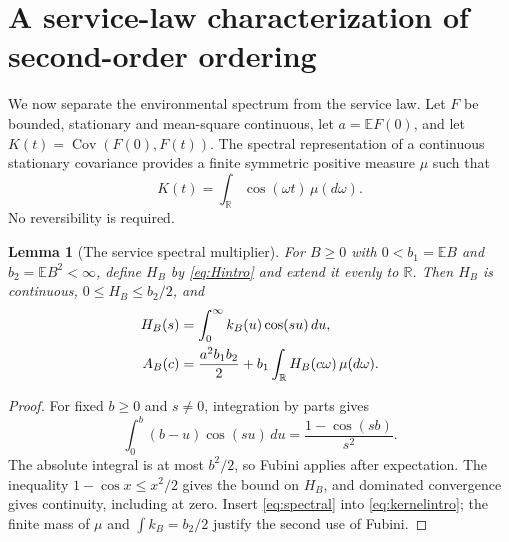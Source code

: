 \documentclass[10pt,a4paper]{amsart}
\numberwithin{equation}{section}
\newtheorem{lemma}[theorem]{Lemma}
\newcommand{\E}{\mathbb E}
\newcommand{\R}{\mathbb R}
\newcommand{\1}{\mathbf 1}
\DeclareMathOperator{\Cov}{Cov}
\begin{document}
\section{A service-law characterization of second-order ordering}\label{sec:service}
We now separate the environmental spectrum from the service law. Let $F$ be bounded, stationary and mean-square continuous, let $a=\E F(0)$, and let $K(t)=\Cov(F(0),F(t))$. The spectral representation of a continuous stationary covariance \cite{Yaglom87} provides a finite symmetric positive measure $\mu$ such that
\begin{equation}\label{eq:spectral}
 K(t)=\int_{\R}\cos(\omega t)\,\mu(d\omega).
\end{equation}
No reversibility is required.

\begin{lemma}[The service spectral multiplier]\label{lem:servicefilter}
For $B\ge0$ with $0<b_1=\E B$ and $b_2=\E B^2<\infty$, define $H_B$ by \eqref{eq:Hintro} and extend it evenly to $\R$. Then $H_B$ is continuous, $0\le H_B\le b_2/2$, and
\begin{align}\label{eq:servicefilter}
 H_B(s)&=\int_0^\infty k_B(u)\cos(su)\,du,\notag\\
 A_B(c)&=\frac{a^2b_1b_2}{2}
                   +b_1\int_{\R}H_B(c\omega)\,\mu(d\omega).
\end{align}
\end{lemma}
\begin{proof}
For fixed $b\ge0$ and $s\ne0$, integration by parts gives
\[
 \int_0^b(b-u)\cos(su)\,du=\frac{1-\cos(sb)}{s^2}.
\]
The absolute integral is at most $b^2/2$, so Fubini applies after expectation. The inequality $1-\cos x\le x^2/2$ gives the bound on $H_B$, and dominated convergence gives continuity, including at zero. Insert \eqref{eq:spectral} into \eqref{eq:kernelintro}; the finite mass of $\mu$ and $\int k_B=b_2/2$ justify the second use of Fubini.
\end{proof}
\end{document}
